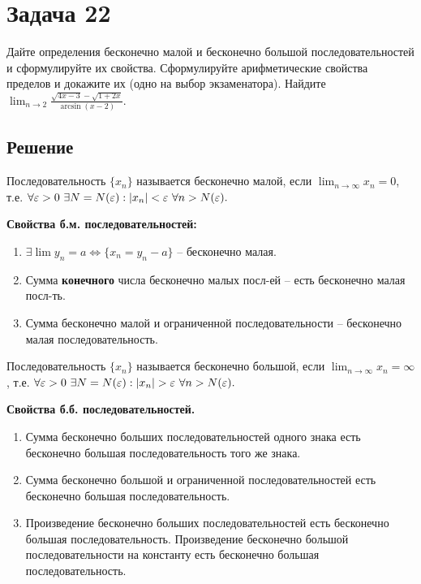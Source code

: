 \section*{Задача 22}

Дайте определения бесконечно малой и бесконечно большой последовательностей и сформулируйте их свойства. Сформулируйте арифметические свойства пределов и докажите их (одно на
выбор экзаменатора). Найдите $\displaystyle \lim_{n\rightarrow 2} 
        \frac{
               \sqrt{4x - 3} -
               \sqrt{1 + 2x}
             }
             {
               \arcsin(x-2)
             }.$

\subsection*{Решение}

\begin{definition} Последовательность $ \{ x_ n \} $ называется бесконечно малой, 
    если $\displaystyle \lim_{n \rightarrow \infty} x_n = 0$, т.е. 
    $\forall \varepsilon > 0\ \exists N = N(\varepsilon):|x_n| < \varepsilon\ \forall n > N(\varepsilon).$
\end{definition}

\textbf{Свойства б.м. последовательностей:}
    \begin{enumerate}
        \item $\exists \lim y_n = a \Leftrightarrow \{x_n = y_n - a\}$ -- бесконечно малая.
        \item Сумма \textbf{конечного} числа бесконечно малых посл-ей -- есть бесконечно малая посл-ть.
        \item Сумма бесконечно малой и ограниченной последовательности -- бесконечно малая последовательность.
    \end{enumerate}

\begin{definition} Последовательность $ \{ x_ n \} $ называется бесконечно большой, 
    если $\displaystyle \lim_{n \rightarrow \infty} x_n = \infty$, т.е. 
    $\forall \varepsilon > 0\ \exists N = N(\varepsilon):|x_n| > \varepsilon\ \forall n > N(\varepsilon).$
\end{definition}
\textbf{Свойства б.б. последовательностей.}
    \begin{enumerate}
        \item Сумма бесконечно больших последовательностей одного знака есть бесконечно большая последовательность того же знака.
        \item Сумма бесконечно большой и ограниченной последовательностей есть бесконечно большая последовательность.
        \item Произведение бесконечно больших последовательностей есть бесконечно большая последовательность. Произведение бесконечно большой последовательности на константу есть бесконечно большая последовательность.
    \end{enumerate}

